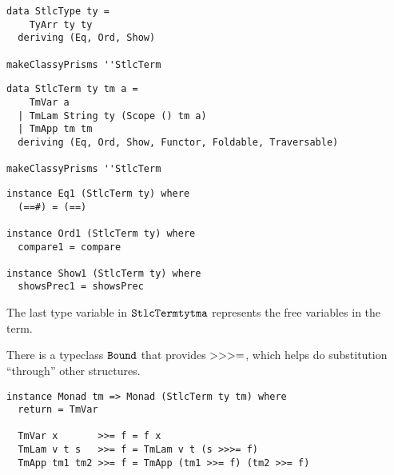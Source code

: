 \documentclass{beamer}
\begin{document}
\begin{frame}[fragile]
  \begin{verbatim}
data StlcType ty =
    TyArr ty ty
  deriving (Eq, Ord, Show)

makeClassyPrisms ''StlcTerm
  \end{verbatim}  

\begin{frame}[fragile]
  \begin{verbatim}
data StlcTerm ty tm a =
    TmVar a
  | TmLam String ty (Scope () tm a)
  | TmApp tm tm
  deriving (Eq, Ord, Show, Functor, Foldable, Traversable)

makeClassyPrisms ''StlcTerm
  \end{verbatim}  

\end{frame}

\begin{frame}[fragile]
  \begin{verbatim}
instance Eq1 (StlcTerm ty) where
  (==#) = (==)

instance Ord1 (StlcTerm ty) where
  compare1 = compare

instance Show1 (StlcTerm ty) where
  showsPrec1 = showsPrec
  \end{verbatim}  
\end{frame}

\begin{frame}[c]
  \begin{center}
   The last type variable in $\tt{StlcTerm ty tm a}$ represents the free
   variables in the term.
  \end{center}
\end{frame}

\begin{frame}[c]
  \begin{center}
  There is a typeclass $\tt{Bound}$ that provides $\tt{>>>=}$, which helps do
  substitution ``through'' other structures.
  \end{center}
\end{frame}

\begin{frame}[fragile]
  \begin{verbatim}
instance Monad tm => Monad (StlcTerm ty tm) where
  return = TmVar 

  TmVar x       >>= f = f x
  TmLam v t s   >>= f = TmLam v t (s >>>= f)
  TmApp tm1 tm2 >>= f = TmApp (tm1 >>= f) (tm2 >>= f)
  \end{verbatim}  
\end{frame}


\end{frame}
\end{document}
